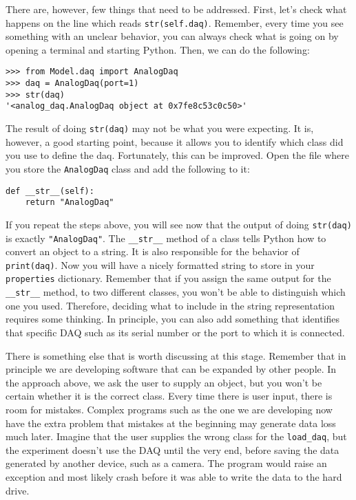 There are, however, few things that need to be addressed. First, let's check what happens on the line which reads \texttt{str(self.daq)}. Remember, every time you see something with an unclear behavior, you can always check what is going on by opening a terminal and starting Python. Then, we can do the following:

\begin{verbatim}
>>> from Model.daq import AnalogDaq
>>> daq = AnalogDaq(port=1)
>>> str(daq)
'<analog_daq.AnalogDaq object at 0x7fe8c53c0c50>'
\end{verbatim}

The result of doing \texttt{str(daq)} may not be what you were expecting. It is, however, a good starting point, because it allows you to identify which class did you use to define the daq. Fortunately, this can be improved. Open the file where you store the \texttt{AnalogDaq} class and add the following to it:

\begin{verbatim}
def __str__(self):
    return "AnalogDaq"
\end{verbatim}

If you repeat the steps above, you will see now that the output of doing \texttt{str(daq)} is exactly \texttt{"AnalogDaq"}. The
\texttt{__str__} method of a class tells Python how to convert an object to a string. It is also responsible for the behavior of \texttt{print(daq)}. Now you will have a nicely formatted string to store in your \texttt{properties} dictionary. Remember that if you assign the same output for the \texttt{__str__} method, to two different classes, you won't be able to distinguish which one you used. Therefore, deciding what to include in the string representation requires some thinking. In principle, you can also add something that identifies that specific DAQ such as its serial number or the port to which it is connected. 

There is something else that is worth discussing at this stage. Remember that in principle we are developing software that can be expanded by other people. In the approach above, we ask the user to supply an object, but you won't be certain whether it is the correct class. Every time there is user input, there is room for mistakes. Complex programs such as the one we are developing now have the extra problem that mistakes at the beginning may generate data loss much later. Imagine that the user supplies the wrong class for the \texttt{load_daq}, but the experiment doesn't use the DAQ until the very end, before saving the data generated by another device, such as a camera. The program would raise an exception and most likely crash before it was able to write the data to the hard drive. 

